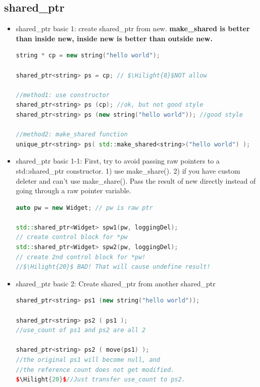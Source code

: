 \documentclass[a4paper,12pt,twoside]{book}
\newcommand{\Hilight}[1]{\makebox[0pt][l]{\color{yellow}\rule[-3pt]{#1em}{11pt}}}
\begin{document}
\subsection{shared\_ptr}
\begin{itemize}

\item shared\_ptr basic 1: create shared\_ptr from new. \textbf{make\_shared is better than inside new, inside new is better than outside new.}
\begin{lstlisting}[frame=single, language=c++]
string * cp = new string("hello world");

shared_ptr<string> ps = cp; // $\Hilight{8}$NOT allow

//method1: use constructor
shared_ptr<string> ps (cp); //ok, but not good style
shared_ptr<string> ps (new string("hello world")); //good style

//method2: make_shared function
unique_ptr<string> ps( std::make_shared<string>("hello world") );
\end{lstlisting}

\item shared\_ptr basic 1-1: First, try to avoid passing raw pointers to a std::shared\_ptr constructor. 1) use make\_share(). 2) if you have custom deleter and can't use make\_share().  Pass the result of new directly instead of going through a raw pointer variable.

\begin{lstlisting}[frame=single, language=c++]
auto pw = new Widget; // pw is raw ptr

std::shared_ptr<Widget> spw1(pw, loggingDel);
// create control block for *pw
std::shared_ptr<Widget> spw2(pw, loggingDel);
// create 2nd control block for *pw!
//$\Hilight{20}$ BAD! That will cause undefine result!
\end{lstlisting}

\item shared\_ptr basic 2: Create shared\_ptr from another shared\_ptr
\begin{lstlisting}[frame=single, language=c++, mathescape=true]
shared_ptr<string> ps1 (new string("hello world"));

shared_ptr<string> ps2 ( ps1 );
//use_count of ps1 and ps2 are all 2

shared_ptr<string> ps2 ( move(ps1) );
//the original ps1 will become null, and
//the reference count does not get modified.
$\Hilight{20}$//Just transfer use_count to ps2. 
\end{lstlisting}


\end{itemize}
\end{document}
